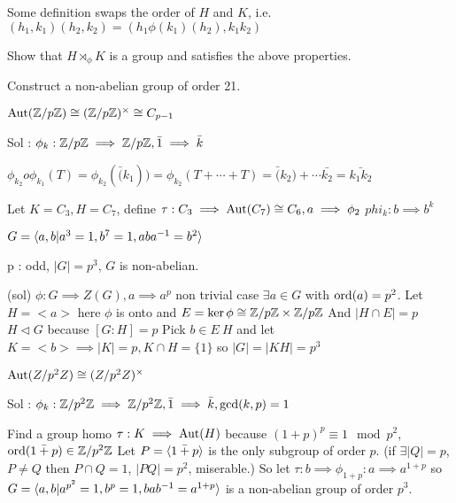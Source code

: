 \begin{remark}
Some definition swaps the order of $H$ and $K$, i.e. $(h_1, k_1) (h_2, k_2) = (h_1 \phi(k_1)(h_2), k_1 k_2)$
\end{remark}

\begin{exercise}
Show that $H \rtimes_\phi K$ is a group and satisfies the above properties.
\end{exercise}

\begin{example}
Construct a non-abelian group of order 21.
\end{example}

\begin{fact}
$\operatorname{Aut}(\mathbb{Z}/p\mathbb{Z}) \cong (\mathbb{Z}/p\mathbb{Z})^\times \cong C_{p-1}$
\end{fact}
Sol : $\phi_k: \mathbb{Z}/p\mathbb{Z} \implies \mathbb{Z}/p\mathbb{Z}, \bar{1} \implies \bar{k}$

$\phi_{k_2} o \phi_{k_1} (T) = \phi_{k_2}(\bar(k_1)) = \phi_{k_2}(T+\cdots+T)
= \bar(k_2) + \cdots \bar{k_2} = \bar{k_1 k_2}$

Let $K = C_3, H = C_7$, define $\tau : C_3 \implies \operatorname{Aut}(C_7) \cong C_6, a \implies \phi_2$
$phi_k : b \implies b^k$

$G = \langle a, b | a^3=1, b^7=1, aba^{-1}=b^2\rangle$

\begin{example}
p : odd, $|G| = p^3$, $G$ is non-abelian.
\end{example}
(sol)
$\phi: G \implies Z(G), a \implies a^p$ non trivial
case $\exists a \in G $ with $\operatorname{ord}(a) = p^2$.
Let $H = <a>$ here $\phi$ is onto and $E = \ker \phi \cong \mathbb{Z}/p\mathbb{Z} \times \mathbb{Z}/p\mathbb{Z}$
And $|H \cap E| = p$
$H \lhd G$ because $[G: H]=p$
Pick $b \in E \ H$ and let $K = <b> \implies |K| = p, K \cap H = \{1\}$
so $|G| = |KH| = p^3$

\begin{fact}
$\operatorname{Aut}(Z/p^2 Z) \cong (Z/p^2 Z)^\times$
\end{fact}
Sol : $\phi_k: \mathbb{Z}/p^2\mathbb{Z} \implies \mathbb{Z}/p^2\mathbb{Z}, \bar{1} \implies \bar{k}, \gcd(k, p) = 1$

Find a group homo $\tau : K \implies \operatorname{Aut}(H)$
because $(1+p)^p \equiv 1 \mod p^2$, $\operatorname{ord}(\bar{1+p}) \in \mathbb{Z}/p^2\mathbb{Z}$
Let $P = \langle\bar{1+p}\rangle$ is the only subgroup of order $p$.
(if $\exists |Q| = p$, $P \neq Q$ then $P \cap Q = 1$, $|PQ| = p^2$, miserable.)
So let $\tau : b \implies \phi_{1+p} : a \implies a^{1+p}$
so $G = \langle a, b | a^{p^2}=1, b^p = 1, bab^{-1} = a^{1+p}\rangle$ is a non-abelian group of order $p^3$.

